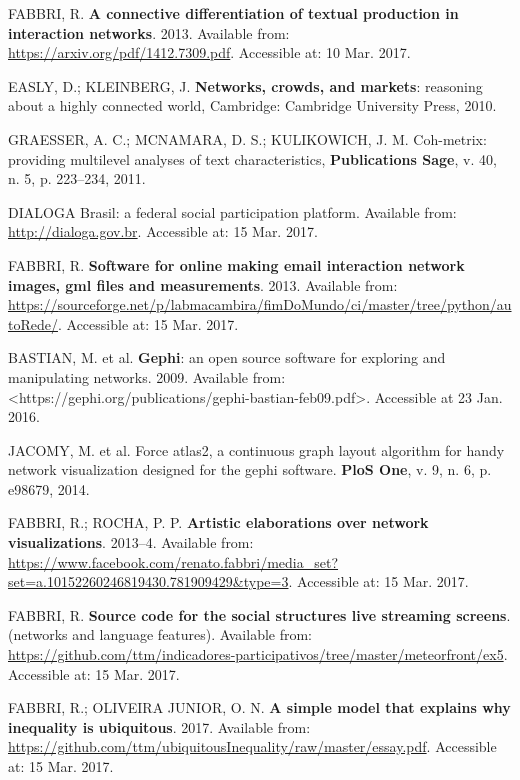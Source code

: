 \documentclass[
12pt,		%
openright,	%
twoside,  %
a4paper,			%
chapter=TITLE,		%
english,			%
french,				%
spanish,			%
brazil				%
]{USPSC}
\begin{document}
\begin{thebibliography}{999}
	FABBRI, R. \textbf{A connective differentiation of textual production in interaction networks}. 2013. Available from: \url{https://arxiv.org/pdf/1412.7309.pdf}. Accessible at: 10 Mar. 2017.

	EASLY, D.; KLEINBERG, J. \textbf{Networks, crowds, and markets}: reasoning about a highly connected world, Cambridge: Cambridge University Press, 2010.

	GRAESSER, A. C.; MCNAMARA, D. S.; KULIKOWICH, J. M. Coh-metrix: providing multilevel analyses of text characteristics, \textbf{Publications Sage}, v. 40, n. 5, p. 223–234, 2011.

	DIALOGA Brasil: a federal social participation platform. Available from: \url{http://dialoga.gov.br}. Accessible at: 15 Mar. 2017.

	FABBRI, R. \textbf{Software for online making email interaction network images, gml files and measurements}. 2013. Available from: \url{https://sourceforge.net/p/labmacambira/fimDoMundo/ci/master/tree/python/autoRede/}. Accessible at: 15 Mar. 2017.

	BASTIAN, M. et al. \textbf{Gephi}: an open source software for exploring and manipulating networks. 2009. Available from: <https://gephi.org/publications/gephi-bastian-feb09.pdf>. Accessible at 23 Jan. 2016.

	JACOMY, M. et al. Force atlas2, a continuous graph layout algorithm for handy network visualization designed for the gephi software. \textbf{PloS One}, v. 9, n. 6, p. e98679, 2014.

	FABBRI, R.; ROCHA, P. P. \textbf{Artistic elaborations over network visualizations}. 2013–4. Available from: \url{https://www.facebook.com/renato.fabbri/media_set?set=a.10152260246819430.781909429&type=3}. Accessible at: 15 Mar. 2017.

	FABBRI, R. \textbf{Source code for the social structures live streaming screens}. (networks and language features). Available from: \url{https://github.com/ttm/indicadores-participativos/tree/master/meteorfront/ex5}. Accessible at: 15 Mar. 2017.

	FABBRI, R.; OLIVEIRA JUNIOR, O. N. \textbf{A simple model that explains why inequality is ubiquitous}. 2017. Available from: \url{https://github.com/ttm/ubiquitousInequality/raw/master/essay.pdf}. Accessible at: 15 Mar. 2017.


\end{thebibliography}
\end{document}
